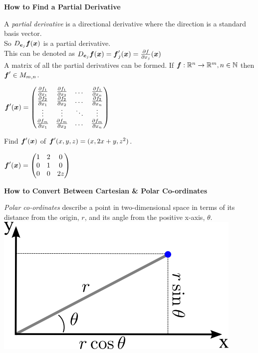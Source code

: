 \documentclass[11pt,a4paper]{article}
\begin{document}
\textbf{How to Find a Partial Derivative}\\

\subtitle{Theory}
A \textit{partial derivative} is a directional derivative where the direction is a standard basis vector.\\
So $D_{\boldsymbol{e}_j}\boldsymbol{f}(\boldsymbol{x})$ is a partial derivative.\\
This can be denoted as $D_{\boldsymbol{e}_j}\boldsymbol{f}(\boldsymbol{x}) = \boldsymbol{f}'_j(\boldsymbol{x}) = \frac{\partial f}{\partial x_j}(\boldsymbol{x})$\\
A matrix of all the partial derivatives can be formed. If $\boldsymbol{f} : \mathbb{R}^n \to \mathbb{R}^m, n \in \mathbb{N}$ then $\boldsymbol{f}' \in M_{m, n}$.\\
\begin{center}$\boldsymbol{f}'(\boldsymbol{x}) = \begin{pmatrix} \frac{\partial f_1}{\partial x_1} & \frac{\partial f_1}{\partial x_2} & \dots & \frac{\partial f_1}{\partial x_n} \\ \frac{\partial f_2}{\partial x_1} & \frac{\partial f_2}{\partial x_2} & \dots & \frac{\partial f_2}{\partial x_n} \\ \vdots & \vdots & \ddots & \vdots \\ \frac{\partial f_m}{\partial x_1} & \frac{\partial f_m}{\partial x_2} & \dots & \frac{\partial f_m}{\partial x_n}\end{pmatrix}$ \end{center}

\subtitle{Example}
Find $\boldsymbol{f}'(\boldsymbol{x})$ of $\boldsymbol{f}'(x,y,z) = (x, 2x+y, z^2)$.\\
\begin{center} $\boldsymbol{f}'(\boldsymbol{x}) = \begin{pmatrix} 1 & 2 & 0 \\ 0 & 1 & 0 \\ 0 & 0 & 2z\end{pmatrix}$ \end{center}

\textbf{How to Convert Between Cartesian \& Polar Co-ordinates}\\

\subtitle{Theory}
\textit{Polar co-ordinates} describe a point in two-dimensional space in terms of its distance from the origin, $r$, and its angle from the positive x-axis, $\theta$.\\
\includegraphics[scale=0.5]{polar.png}\\
\end{document}
